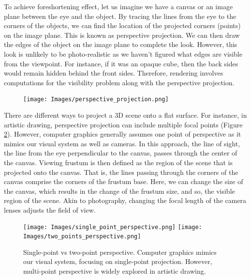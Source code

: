 To achieve foreshortening effect, let us imagine we have a canvas or an image plane between the eye and the object. By tracing the lines from the eye to the corners of the objects, we can find the location of the projected corners (points) on the image plane. This is known as perspective projection. We can then draw the edges of the object on the image plane to complete the look. However, this look is unlikely to be photo-realistic as we haven't figured what edges are visible from the viewpoint. For instance, if it was an opaque cube, then the back sides would remain hidden behind the front sides. Therefore, rendering involves computations for the visibility problem along with the perspective projection. 

\begin{figure}[h]
  \centering
   \texttt{[image: Images/perspective\_projection.png]}
   \caption{}
   \label{fig:perspective_projection}
\end{figure}



There are different ways to project a 3D scene onto a flat surface. For instance, in artistic drawing, perspective projection can include multiple focal points (Figure \ref{fig:artistic_drawing}). However, computer graphics generally assumes one point of perspective as it mimics our visual system as well as cameras.  In this approach, the line of sight, the line from the eye perpendicular to the canvas, passes through the center of the canvas. Viewing frustum is then defined as the region of the scene that is projected onto the canvas. That is, the lines passing through the corners of the canvas comprise the corners of the frustum base. Here, we can change the size of the canvas, which results in the change of the frustum size, and so, the visible region of the scene. Akin to photography, changing the focal length of the camera lenses adjusts the field of view.

\begin{figure}[h]
  \centering
   \texttt{[image: Images/single\_point\_perspective.png]}
    \texttt{[image: Images/two\_points\_perspective.png]}

   \caption{Single-point vs two-point perspective. Computer graphics mimics our visual system, focusing on single-point projection. However, multi-point perspective is widely explored in artistic drawing.}
   \label{fig:artistic_drawing}
\end{figure}


